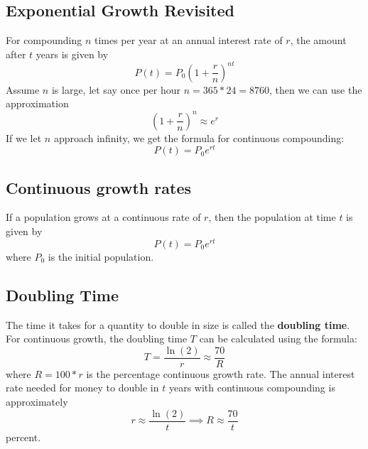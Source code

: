 \subsection{Exponential Growth Revisited}
For compounding \(n\) times per year at an annual interest rate of \(r\), the amount after \(t\) years is given by
\[ P(t) = P_{0}\left(1+\frac{r}{n}\right)^{nt} \]
Assume \(n\) is large, let say once per hour \(n= 365*24 = 8760\), then we can use the approximation
\[ \left(1+\frac{r}{n}\right)^{n} \approx e^{r} \]
If we let \(n\) approach infinity, we get the formula for continuous compounding:
\[ P(t) = P_{0}e^{rt} \]

\subsection{Continuous growth rates}
If a population grows at a continuous rate of \(r\), then the population at time \(t\) is given by
\[ P(t) = P_{0}e^{rt} \]
where \(P_{0}\) is the initial population.

\subsection{Doubling Time}
The time it takes for a quantity to double in size is called the \textbf{doubling time}. For continuous growth, the doubling time \(T\) can be calculated using the formula:
\[ T = \frac{\ln(2)}{r}  \approx \frac{70}{R} \]
where \(R = 100*r \)  is the percentage continuous growth rate.
The annual interest rate needed for money to double in \(t\) years with continuous compounding is approximately
\[ r \approx \frac{\ln(2)}{t}   \implies R \approx \frac{70}{t} \]
percent.
